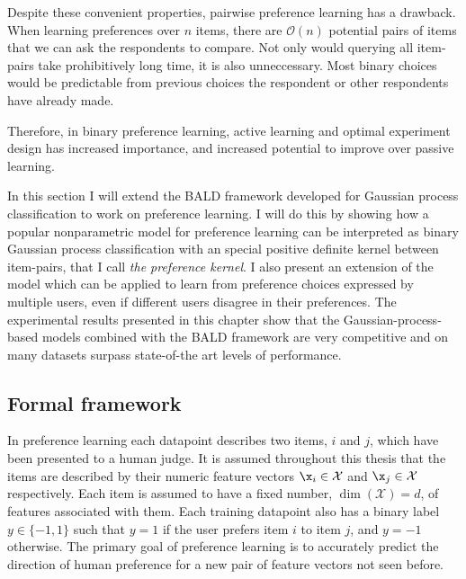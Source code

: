 Despite these convenient properties, pairwise preference learning has a drawback. When learning preferences over $n$ items, there are $\mathcal{O}(n)$ potential pairs of items that we can ask the respondents to compare. Not only would querying all item-pairs take prohibitively long time, it is also unneccessary. Most binary choices would be predictable from previous choices the respondent or other respondents have already made.

Therefore, in binary preference learning, active learning and optimal experiment design has increased importance, and increased potential to improve over passive learning.

In this section I will extend the BALD framework developed for Gaussian process classification to work on preference learning. I will do this by showing how a popular nonparametric model for preference learning can be interpreted as binary Gaussian process classification with an special positive definite kernel between item-pairs, that I call \emph{the preference kernel}. I also present an extension of the model which can be applied to learn from preference choices expressed by multiple users, even if different users disagree in their preferences. The experimental results presented in this chapter show that the Gaussian-process-based models combined with the BALD framework are very competitive and on many datasets surpass state-of-the art levels of performance.


\subsection{Formal framework\label{sec:prefKernel}}

In preference learning each datapoint describes two items, $i$ and $j$, which have been presented to a human judge. It is assumed throughout this thesis that the items are described by their numeric feature vectors $\x_i\in\mathcal{X}$ and $\x_j\in\mathcal{X}$ respectively. Each item is assumed to have a fixed number, $\dim(\mathcal{X})=d$, of features associated with them. Each training datapoint also has a binary label $y\in\{-1,1\}$ such that $y=1$ if the user prefers item $i$ to item $j$, and $y=-1$ otherwise. The primary goal of preference learning is to accurately predict the direction of human preference for a new pair of feature vectors not seen before.

